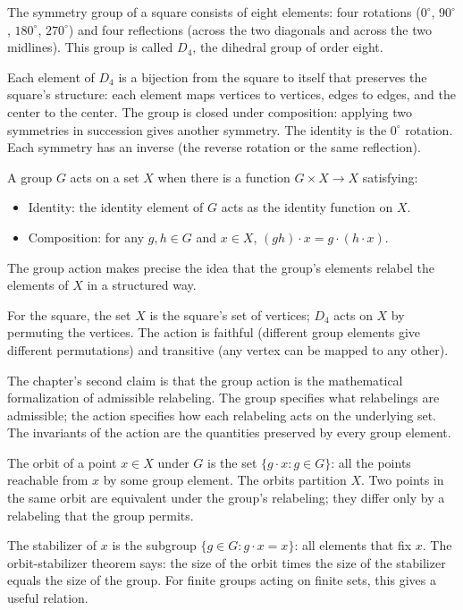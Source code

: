 The symmetry group of a square consists of eight elements: four
rotations ($0^\circ$, $90^\circ$, $180^\circ$, $270^\circ$) and
four reflections (across the two diagonals and across the two
midlines). This group is called $D_4$, the dihedral group of
order eight.

Each element of $D_4$ is a bijection from the square to itself
that preserves the square's structure: each element maps vertices
to vertices, edges to edges, and the center to the center. The
group is closed under composition: applying two symmetries in
succession gives another symmetry. The identity is the
$0^\circ$ rotation. Each symmetry has an inverse (the reverse
rotation or the same reflection).

A group $G$ acts on a set $X$ when there is a function $G \times X
\to X$ satisfying:
\begin{itemize}
\item Identity: the identity element of $G$ acts as the identity
function on $X$.
\item Composition: for any $g, h \in G$ and $x \in X$, $(g h) \cdot
x = g \cdot (h \cdot x)$.
\end{itemize}
The group action makes precise the idea that the group's elements
relabel the elements of $X$ in a structured way.

For the square, the set $X$ is the square's set of vertices; $D_4$
acts on $X$ by permuting the vertices. The action is faithful
(different group elements give different permutations) and
transitive (any vertex can be mapped to any other).

The chapter's second claim is that the group action is the
mathematical formalization of admissible relabeling. The group
specifies what relabelings are admissible; the action specifies
how each relabeling acts on the underlying set. The invariants
of the action are the quantities preserved by every group
element.

The orbit of a point $x \in X$ under $G$ is the set $\{g \cdot x :
g \in G\}$: all the points reachable from $x$ by some group
element. The orbits partition $X$. Two points in the same orbit
are equivalent under the group's relabeling; they differ only by
a relabeling that the group permits.

The stabilizer of $x$ is the subgroup $\{g \in G : g \cdot x = x\}$:
all elements that fix $x$. The orbit-stabilizer theorem says: the
size of the orbit times the size of the stabilizer equals the size
of the group. For finite groups acting on finite sets, this gives
a useful relation.

